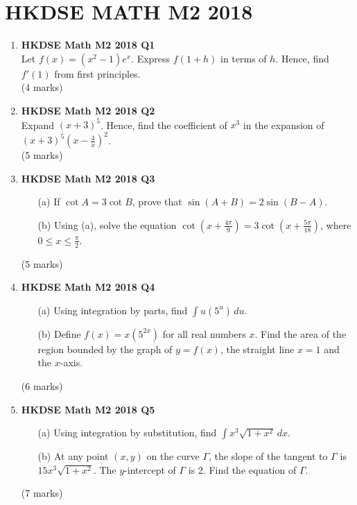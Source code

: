 \documentclass{report}
\begin{document}
\chapter{HKDSE MATH M2 2018}
\begin{enumerate}
	\item \textbf{HKDSE Math M2 2018 Q1}\\
	Let $\displaystyle f(x) = (x^2-1)e^x$.  Express $f(1+h)$ in terms of $h$. Hence, find  $f'(1)$ from first principles. \\(4 marks)

	\item  \textbf{HKDSE Math M2 2018 Q2}\\
	Expand $(x+3)^5$. Hence, find the coefficient of $x^3$ in the expansion of $(x+3)^5 \displaystyle\left(x - \frac{4}{x}\right) ^ 2$. \\(5 marks)

	\item \textbf{HKDSE Math M2 2018 Q3}
	\begin{enumerate}
		\item [(a)] If $\cot{A} = 3\cot{B}$, prove that $\sin{(A+B)} = 2\sin{(B-A)}$. 
		\item [(b)] Using (a), solve the equation $\displaystyle\cot{(x+\frac{4\pi}{9})} = 3\cot{(x+\frac{5\pi}{18})}$, where $0 \leq x \leq \displaystyle\frac{\pi}{2}$.
	\end{enumerate}
	(5 marks)

	\item \textbf{HKDSE Math M2 2018 Q4}
	\begin{enumerate}
		\item [(a)]Using integration by parts, find $\displaystyle\int u(5^u) \,du$. 
		\item [(b)]Define $f(x) = x(5^{2x})$ for all real numbers $x$. Find the area of the region bounded by the graph of $y = f(x)$, the straight line $x = 1$ and the $x$-axis.
	\end{enumerate}
	(6 marks)

	\item \textbf{HKDSE Math M2 2018 Q5}
	\begin{enumerate}
		\item [(a)]Using integration by substitution, find $\displaystyle\int x^3\sqrt{1 + x^2} \,dx$. 
		\item [(b)]At any point $(x,y)$ on the curve $\Gamma$, the slope of the tangent to $\Gamma$ is $15x^3\sqrt{1+x^2}$. The $y$-intercept of $\Gamma$ is 2. Find the equation of $\Gamma$.
	\end{enumerate}
	(7 marks)


\end{enumerate}
\end{document}
